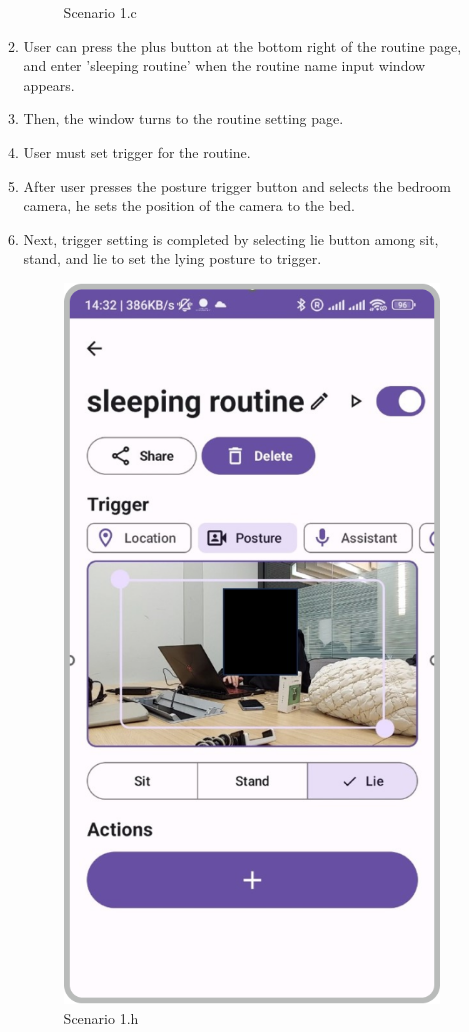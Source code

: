 \begin{enumerate}
\begin{enumerate}
\begin{figure}[hbt!]
                        \caption{Scenario 1.c}
                    \end{figure}
              \newpage
              \item User can press the plus button at the bottom right of the routine page, and enter 'sleeping routine' when the routine name input window appears. \\
              \item Then, the window turns to the routine setting page.\\
              \item User must set trigger for the routine. \\
              \item After user presses the posture trigger button and selects the bedroom camera, he sets the position of the camera to the bed. \\
              \item Next, trigger setting is completed by selecting lie button among sit, stand, and lie to set the lying posture to trigger.\\
                    \begin{figure}[hbt!]
                        \centering
                        \includegraphics[width=0.5\linewidth]{imgs/usercase/usercase_scenario1_8.png}
                        \caption{Scenario 1.h}
                    \end{figure}

\end{enumerate}
\end{enumerate}
